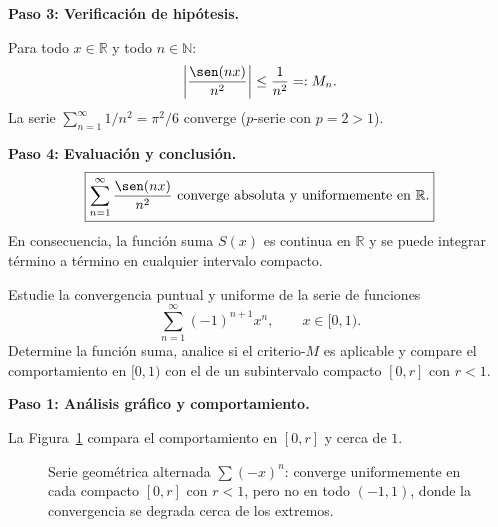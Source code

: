 \begin{example}
\begin{myproof}
\textbf{Paso 3: Verificación de hipótesis.}

Para todo $x \in \mathbb{R}$ y todo $n \in \mathbb{N}$:
\[
    \left|\frac{\sen(nx)}{n^2}\right| \leq \frac{1}{n^2} =: M_n.
\]
La serie $\sum_{n=1}^\infty 1/n^2 = \pi^2/6$ converge ($p$-serie con
$p=2>1$).

\textbf{Paso 4: Evaluación y conclusión.}
\[
    \boxed{\sum_{n=1}^\infty \frac{\sen(nx)}{n^2}
    \text{ converge absoluta y uniformemente en } \mathbb{R}.}
\]
En consecuencia, la función suma $S(x)$ es continua en $\mathbb{R}$
y se puede integrar término a término en cualquier intervalo compacto.
\end{myproof}
\end{example}

\begin{example}
Estudie la convergencia puntual y uniforme de la serie de funciones
\[
    \sum_{n=1}^\infty (-1)^{n+1} x^n, \qquad x \in [0,1).
\]
Determine la función suma, analice si el criterio-$M$ es aplicable
y compare el comportamiento en $[0,1)$ con el de un subintervalo
compacto $[0,r]$ con $r<1$. 
\begin{myproof}
\textbf{Paso 1: Análisis gráfico y comportamiento.}

La Figura~\ref{fig:ssf_geometrica_compactos} compara el comportamiento en $[0,r]$ y cerca de $1$.

\begin{figure}[H]
\centering
{}
\caption{Serie geométrica alternada $\sum(-x)^n$: converge uniformemente en cada compacto $[0,r]$ con $r<1$, pero no en todo $(-1,1)$, donde la convergencia se degrada cerca de los extremos.}
\label{fig:ssf_geometrica_compactos}
\end{figure}


\end{myproof}
\end{example}
